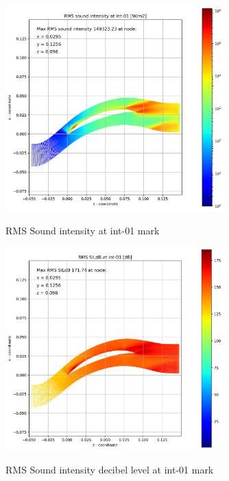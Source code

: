 \begin{figure}[ht]
  \centering
  \includegraphics[width=0.75\textwidth]{Figures/int-01-rms-sil.png} \label{int-01-rms-sil}
  \caption{RMS Sound intensity at int-01 mark}
  
  \vspace*{\floatsep}%

  \includegraphics[width=0.75\textwidth]{Figures/int-01-rms-sildb.png} \label{int-01-rms-sildb}
  \caption{RMS Sound intensity decibel level at int-01 mark}
\end{figure}

